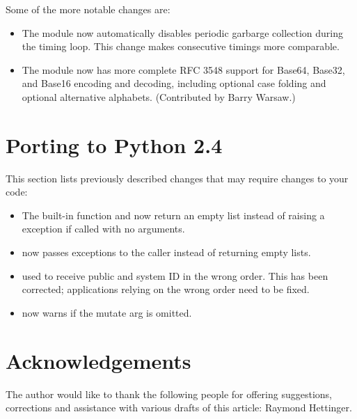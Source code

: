 \documentclass{howto}
\begin{document}
Some of the more notable changes are:

\begin{itemize}

\item The  module now automatically disables periodic
  garbarge collection during the timing loop.  This change makes
  consecutive timings more comparable.

\item The  module now has more complete RFC 3548 support
  for Base64, Base32, and Base16 encoding and decoding, including
  optional case folding and optional alternative alphabets.
  (Contributed by Barry Warsaw.)

\end{itemize}


\section{Porting to Python 2.4}

This section lists previously described changes that may require
changes to your code:

\begin{itemize}

\item The  built-in function and 
  now return  an empty list instead of raising a 
  exception if called with no arguments.

\item {} now passes exceptions to the caller
      instead of returning empty lists.

\item {} used to receive public and
  system ID in the wrong order.  This has been corrected; applications
  relying on the wrong order need to be fixed.

\item {} now warns if the mutate arg is omitted.

\end{itemize}


\section{Acknowledgements \label{acks}}

The author would like to thank the following people for offering
suggestions, corrections and assistance with various drafts of this
article: Raymond Hettinger.
\end{document}
